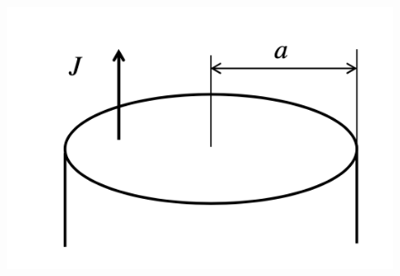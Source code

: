 \documentclass[dvipdfmx]{ujarticle}
\begin{document}
\begin{figure}[h]
	\centering
	\includegraphics[scale=0.35]{./fig/R03_fig4.png}
	\caption{}
	\label{fig:4}
\end{figure}
\end{document}
